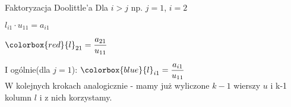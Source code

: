 \begin{frame}{Faktoryzacja Doolittle'a}
Dla $i>j$ np. $j=1$, $i=2$


\vspace{0.5cm}
$l_{i1}\cdot u_{11}=a_{i1}$

$\colorbox{red}{l}_{21}=\displaystyle \frac{a_{21}}{u_{11}}$

I ogólnie(dla $j=1$):
$\colorbox{blue}{l}_{i1}=\displaystyle \frac{a_{i1}}{u_{11}}$\\
W kolejnych  krokach analogicznie -  mamy już wyliczone $k-1$ wierszy $u$ i k-1 kolumn $l$ i z nich korzystamy. 
\end{frame}

